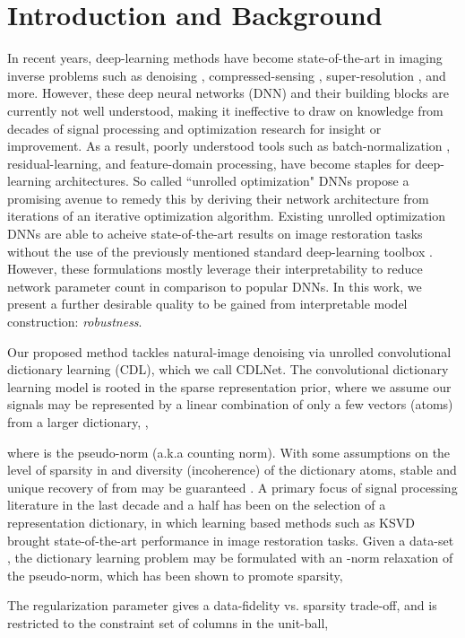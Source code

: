 \documentclass[conference]{IEEEtran}
\newcommand{\soa}{state-of-the-art }
\begin{document}
\section{Introduction and Background}
In recent years, deep-learning methods have become \soa in imaging inverse
problems such as denoising \cite{DnCNN,FFDNet}, compressed-sensing \cite{Lecouat2020Games},
super-resolution \cite{DnCNN}, and more. However, these deep neural
networks (DNN) and their building blocks are currently not well understood, making it ineffective to draw on knowledge from
decades of signal processing and optimization research for insight or
improvement. As a result, poorly understood tools such as
batch-normalization \cite{Ioffe2015}, residual-learning, and feature-domain processing, have become staples for deep-learning
architectures. So called ``unrolled optimization" DNNs \cite{unrolling} propose a promising avenue to remedy this by deriving their network architecture from  iterations of an iterative optimization algorithm. Existing unrolled optimization DNNs are able to acheive \soa results on image restoration tasks without the use of the previously mentioned standard deep-learning toolbox  \cite{Simon2019, Lecouat2020Games}. However, these formulations mostly leverage their interpretability to reduce network parameter count in comparison to popular DNNs. In this work, we present a further desirable quality to be gained from interpretable model construction: \textit{robustness}. 

Our proposed method tackles natural-image denoising via unrolled convolutional dictionary learning (CDL), which we call CDLNet. The convolutional dictionary learning model is rooted in the sparse representation prior, where we assume our signals  may be represented by a linear combination of only a few vectors (atoms) from a larger dictionary, ,

where  is the  pseudo-norm (a.k.a counting norm). With some assumptions on the level of sparsity in  and diversity (incoherence) of the dictionary atoms, stable and unique recovery of  from  may be guaranteed \cite{Mallat}. A primary focus of signal processing literature in the last decade and a half has been on the selection of a representation dictionary, in which learning based methods such as KSVD \cite{KSVD} brought \soa performance in image restoration tasks. Given a data-set , the dictionary learning problem may be formulated with an -norm relaxation of the  pseudo-norm, which has been shown to promote sparsity,

The regularization parameter  gives a data-fidelity vs. sparsity trade-off, and  is restricted to the constraint set of columns in the unit-ball,
\end{document}
